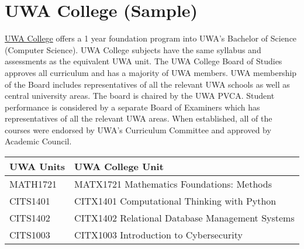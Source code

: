 

\section{UWA College (Sample)}

\href{https://www.uwa.edu.au/uwa-college}{UWA College} offers a 1 year foundation program into UWA's Bachelor of Science (Computer Science).
UWA College subjects have the same syllabus and assessments as the equivalent UWA unit. 
The UWA College Board of Studies approves all curriculum and has a majority of UWA members. 
UWA membership of the Board includes representatives of all the relevant UWA schools as well as central university areas. The board is chaired by the UWA PVCA. Student performance is considered by a separate Board of Examiners which has representatives of all the relevant UWA areas. When established, all of the courses were endorsed by UWA's 
Curriculum Committee and approved by Academic Council.  

\bigskip
\begin{tabular}{ p{2.5cm} p{10cm} }
\toprule
UWA Units & UWA College Unit \\
\midrule
MATH1721  & MATX1721 Mathematics Foundations: Methods\\
CITS1401  & CITX1401 Computational Thinking with Python\\
CITS1402  & CITX1402 Relational Database Management Systems\\
CITS1003  & CITX1003 Introduction to Cybersecurity\\
\bottomrule
\end{tabular}





